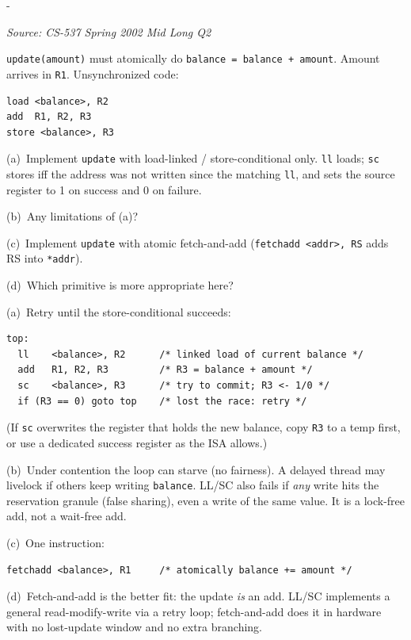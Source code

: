 \documentclass[11pt,a4paper]{article}
\makeatletter
\newcommand{\keepspace}[1]{\par\penalty-100\begingroup
  \setlength{\dimen@}{#1}\dimen@ii\pagegoal\advance\dimen@ii-\pagetotal
  \ifdim\dimen@>\dimen@ii\ifdim\dimen@ii>\z@\vfil\fi\break\fi\endgroup}
\newcounter{qn}[section]
\newenvironment{Qn}[4]{%
  \refstepcounter{qn}\keepspace{7\baselineskip}%
  \begin{tcolorbox}[qboxstyle, title={Q\thesection.\theqn\ \ [#1 \textbar\ #2]\ \ #4}]%
  {\footnotesize\color{g3}\textit{Source: #3}}\par\smallskip%
}{%
  \end{tcolorbox}%
}
\newenvironment{Sol}{%
  \begin{tcolorbox}[sboxstyle, title={Solution}]%
}{%
  \end{tcolorbox}\vspace{0.35em}%
}
\makeatother
\begin{document}
\begin{Qn}{Hard}{Lect 17}{CS-537 Spring 2002 Mid Long Q2}{Synchronize \texttt{balance += amount} with LL/SC and with fetch-and-add}
\texttt{update(amount)} must atomically do \texttt{balance = balance + amount}. Amount arrives in \texttt{R1}. Unsynchronized code:

\begin{lstlisting}[numbers=none]
load <balance>, R2
add  R1, R2, R3
store <balance>, R3
\end{lstlisting}

(a)~Implement \texttt{update} with load-linked / store-conditional only. \texttt{ll} loads; \texttt{sc} stores iff the address was not written since the matching \texttt{ll}, and sets the source register to 1 on success and 0 on failure.

(b)~Any limitations of (a)?

(c)~Implement \texttt{update} with atomic fetch-and-add (\texttt{fetchadd <addr>, RS} adds RS into \texttt{*addr}).

(d)~Which primitive is more appropriate here?
\end{Qn}
\begin{Sol}
(a)~Retry until the store-conditional succeeds:

\begin{lstlisting}[numbers=none]
top:
  ll    <balance>, R2      /* linked load of current balance */
  add   R1, R2, R3         /* R3 = balance + amount */
  sc    <balance>, R3      /* try to commit; R3 <- 1/0 */
  if (R3 == 0) goto top    /* lost the race: retry */
\end{lstlisting}

(If \texttt{sc} overwrites the register that holds the new balance, copy \texttt{R3} to a temp first, or use a dedicated success register as the ISA allows.)

(b)~Under contention the loop can starve (no fairness). A delayed thread may livelock if others keep writing \texttt{balance}. LL/SC also fails if \emph{any} write hits the reservation granule (false sharing), even a write of the same value. It is a lock-free add, not a wait-free add.

(c)~One instruction:
\begin{lstlisting}[numbers=none]
fetchadd <balance>, R1     /* atomically balance += amount */
\end{lstlisting}

(d)~Fetch-and-add is the better fit: the update \emph{is} an add. LL/SC implements a general read-modify-write via a retry loop; fetch-and-add does it in hardware with no lost-update window and no extra branching.
\end{Sol}
\end{document}
